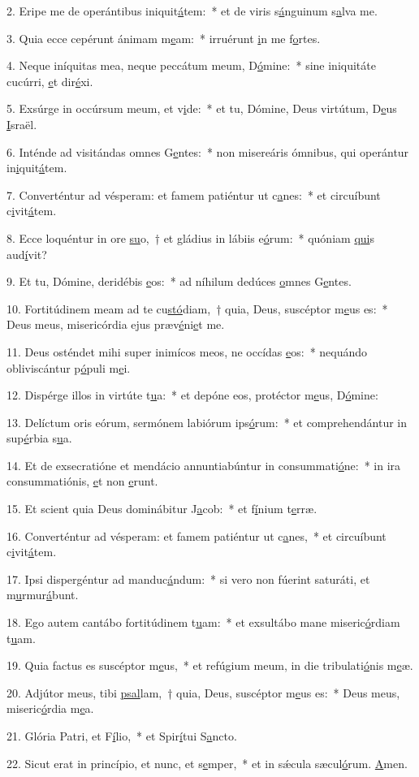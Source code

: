 2. Eripe me de operántibus iniquit\uline{á}tem:~* et de viris s\uline{á}nguinum s\uline{a}lva me.\par 
3. Quia ecce cepérunt ánimam m\uline{e}am:~* irruérunt \uline{i}n me f\uline{o}rtes.\par 
4. Neque iníquitas mea, neque peccátum meum, D\uline{ó}mine:~* sine iniquitáte cucúrri, \uline{e}t dir\uline{é}xi.\par 
5. Exsúrge in occúrsum meum, et v\uline{i}de:~* et tu, Dómine, Deus virtútum, D\uline{e}us \uline{I}sraël.\par 
6. Inténde ad visitándas omnes G\uline{e}ntes:~* non misereáris ómnibus, qui operántur in\uline{i}quit\uline{á}tem.\par 
7. Converténtur ad vésperam: et famem patiéntur ut c\uline{a}nes:~* et circuíbunt c\uline{i}vit\uline{á}tem.\par 
8. Ecce loquéntur in ore \uline{su}o,~† et gládius in lábiis e\uline{ó}rum:~* quóniam \uline{qui}s aud\uline{í}vit?\par 
9. Et tu, Dómine, deridébis \uline{e}os:~* ad níhilum dedúces \uline{o}mnes G\uline{e}ntes.\par 
10. Fortitúdinem meam ad te cu\uline{stó}diam,~† quia, Deus, suscéptor m\uline{e}us es:~* Deus meus, misericórdia ejus præv\uline{é}ni\uline{e}t me.\par 
11. Deus osténdet mihi super inimícos meos, ne occídas \uline{e}os:~* nequándo obliviscántur p\uline{ó}puli m\uline{e}i.\par 
12. Dispérge illos in virtúte t\uline{u}a:~* et depóne eos, protéctor m\uline{e}us, D\uline{ó}mine:\par 
13. Delíctum oris eórum, sermónem labiórum ips\uline{ó}rum:~* et comprehendántur in sup\uline{é}rbia s\uline{u}a.\par 
14. Et de exsecratióne et mendácio annuntiabúntur in consummati\uline{ó}ne:~* in ira consummatiónis, \uline{e}t non \uline{e}runt.\par 
15. Et scient quia Deus dominábitur J\uline{a}cob:~* et f\uline{í}nium t\uline{e}rræ.\par 
16. Converténtur ad vésperam: et famem patiéntur ut c\uline{a}nes,~* et circuíbunt c\uline{i}vit\uline{á}tem.\par 
17. Ipsi dispergéntur ad manduc\uline{á}ndum:~* si vero non fúerint saturáti, et m\uline{u}rmur\uline{á}bunt.\par 
18. Ego autem cantábo fortitúdinem t\uline{u}am:~* et exsultábo mane miseric\uline{ó}rdiam t\uline{u}am.\par 
19. Quia factus es suscéptor m\uline{e}us,~* et refúgium meum, in die tribulati\uline{ó}nis m\uline{e}æ.\par 
20. Adjútor meus, tibi \uline{psal}lam,~† quia, Deus, suscéptor m\uline{e}us es:~* Deus meus, miseric\uline{ó}rdia m\uline{e}a.\par 
21. Glória Patri, et F\uline{í}lio,~* et Spir\uline{í}tui S\uline{a}ncto.\par 
22. Sicut erat in princípio, et nunc, et s\uline{e}mper,~* et in sǽcula sæcul\uline{ó}rum. \uline{A}men.\par 
